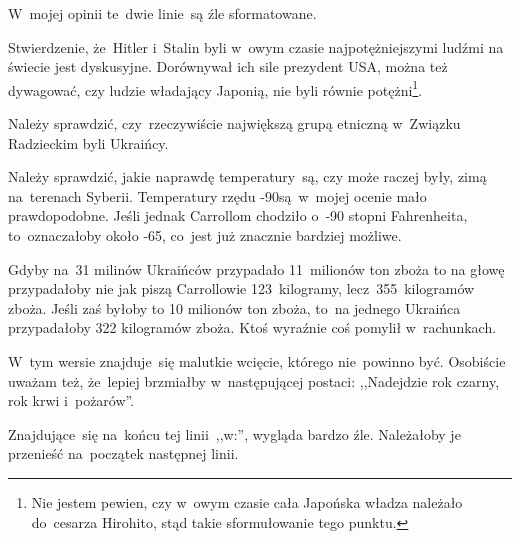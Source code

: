 \documentclass[a4paper,11pt]{article}
\begin{document}
\vspace{\spaceFour}


\start {} W~mojej opinii te~dwie linie~są źle
sformatowane.

\vspace{\spaceFour}


\start {} Stwierdzenie, że~Hitler i~Stalin byli w~owym czasie
najpotężniejszymi ludźmi na świecie jest dyskusyjne. Dorównywał ich
sile prezydent USA, można też dywagować, czy ludzie władający Japonią,
nie byli równie potężni\footnote{Nie jestem pewien, czy w~owym czasie
  cała Japońska władza należało do~cesarza Hirohito, stąd takie
  sformułowanie tego punktu.}.

\vspace{\spaceFour}


\start {} Należy sprawdzić, czy~rzeczywiście największą grupą
etniczną w~Związku Radzieckim byli Ukraińcy.

\vspace{\spaceFour}


\start {} Należy sprawdzić, jakie naprawdę temperatury~są, czy
może raczej były, zimą na~terenach Syberii. Temperatury rzędu
-90\textcelsius są~w~mojej ocenie mało prawdopodobne. Jeśli jednak
Carrollom chodziło o~-90 stopni Fahrenheita, to~oznaczałoby około
-65\textcelsius, co~jest już znacznie bardziej możliwe.

\vspace{\spaceFour}


 Gdyby na~31 milinów Ukraińców przypadało 11~milionów ton
zboża to na głowę przypadałoby nie jak piszą Carrollowie
123~kilogramy, lecz~355~kilogramów zboża. Jeśli zaś byłoby to 10
milionów ton zboża, to~na jednego Ukraińca przypadałoby 322 kilogramów
zboża. Ktoś wyraźnie coś pomylił w~rachunkach.

\vspace{\spaceFour}


\start {} W~tym wersie znajduje~się malutkie wcięcie,
którego nie~powinno być. Osobiście uważam też, że~lepiej brzmiałby
w~następującej postaci: ,,Nadejdzie rok czarny, rok krwi i~pożarów''.

\vspace{\spaceFour}


\start {} Znajdujące~się na~końcu tej linii~,,w:'',
wygląda bardzo źle. Należałoby je przenieść na~początek następnej
linii.

\vspace{\spaceFour}
\end{document}
